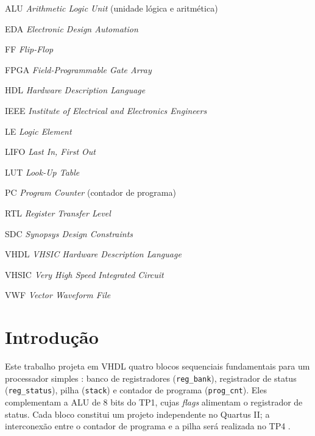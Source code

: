 \documentclass[
	12pt,				%
	oneside,			%
	a4paper,			%
	sumario = tradicional,
	english,			%
	brazilian			%
	]{abntex2}
\begin{document}
{\SingleSpacing
{}
\listoffigures*
\vspace{1cm}
\listofcodigos*
\cleardoublepage
{}
\listoftables*
\cleardoublepage
\begin{siglas}
  \item[ALU] \textit{Arithmetic Logic Unit} (unidade lógica e aritmética)
  \item[EDA] \textit{Electronic Design Automation}
  \item[FF] \textit{Flip-Flop}
  \item[FPGA] \textit{Field-Programmable Gate Array}
  \item[HDL] \textit{Hardware Description Language}
  \item[IEEE] \textit{Institute of Electrical and Electronics Engineers}
  \item[LE] \textit{Logic Element}
  \item[LIFO] \textit{Last In, First Out}
  \item[LUT] \textit{Look-Up Table}
  \item[PC] \textit{Program Counter} (contador de programa)
  \item[RTL] \textit{Register Transfer Level}
  \item[SDC] \textit{Synopsys Design Constraints}
  \item[VHDL] \textit{VHSIC Hardware Description Language}
  \item[VHSIC] \textit{Very High Speed Integrated Circuit}
  \item[VWF] \textit{Vector Waveform File}
\end{siglas}
\cleardoublepage
{}
\tableofcontents*
\cleardoublepage}

\textual

\chapter{Introdução}
\label{cap:introducao}

Este trabalho projeta em VHDL quatro blocos sequenciais fundamentais para um processador simples \cite{ashenden2008,pedroni2010}: banco de registradores (\texttt{reg\_bank}), registrador de status (\texttt{reg\_status}), pilha (\texttt{stack}) e contador de programa (\texttt{prog\_cnt}). Eles complementam a ALU de 8 bits do TP1, cujas \textit{flags} alimentam o registrador de status. Cada bloco constitui um projeto independente no Quartus II; a interconexão entre o contador de programa e a pilha será realizada no TP4 \cite{tp2}.
\end{document}
